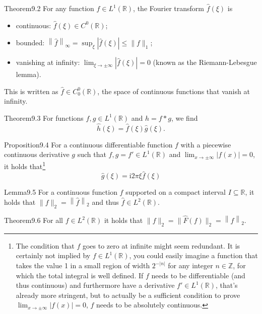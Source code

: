 \begin{res}{Theorem}{9.2}
For any function $f\in L^1(\mathbb R)$, the Fourier transform $\widehat f(\xi)$ is
\begin{itemize}
\item continuous: $\widehat f(\xi)\in C^0(\mathbb R)$;
\item bounded: $\left\|\widehat f\right\|_\infty=\sup_\xi\left|\widehat f(\xi)\right|\le\|f\|_1$;
\item vanishing at infinity: $\lim_{\xi\to\pm\infty}\left|\widehat f(\xi)\right|=0$ (known as the Riemann-Lebesgue lemma).
\end{itemize}
This is written as $\widehat f\in C^0_0(\mathbb R)$, the space of continuous functions that vanish at infinity.
\end{res}

\begin{res}[Convolution]{Theorem}{9.3}
For functions $f,g\in L^1(\mathbb R)$ and $h=f*g$, we find
\begin{equation}\widehat h(\xi)=\widehat f(\xi)\widehat g(\xi).\tag{9.16}\end{equation}
\end{res}

\begin{res}{Proposition}{9.4}
For a continuous differentiable function $f$ with a piecewise continuous derivative $g$ such that $f,g=f'\in L^1(\mathbb R)$ and $\lim_{x\to\pm\infty}|f(x)|=0$, it holds that\footnote{The condition that $f$ goes to zero at infinite might seem redundant. It is certainly not implied by $f\in L^1(\mathbb R)$, you could easily imagine a function that takes the value 1 in a small region of width $2^{-|n|}$ for any integer $n\in\mathbb Z$, for which the total integral is well defined. If $f$ needs to be differentiable (and thus continuous) and furthermore have a derivative $f'\in L^1(\mathbb R)$, that's already more stringent, but to actually be a sufficient condition to prove $\lim_{x\to\pm\infty}|f(x)|=0$, $f$ needs to be absolutely continuous.}
\[\widehat g(\xi)=\mathrm i2\pi\xi\widehat f(\xi)\]
\end{res}

\begin{res}{Lemma}{9.5}
For a continuous function $f$ supported on a compact interval $I\subseteq\mathbb R$, it holds that $\|f\|_2=\left\|\widehat f\right\|_2$ and thus $\widehat f\in L^2(\mathbb R)$.
\end{res}

\begin{res}[Plancherel]{Theorem}{9.6}
For all $f\in L^2(\mathbb R)$ it holds that $\|f\|_2=\|\hat F(f)\|_2=\left\|\widehat f\right\|_2$.
\end{res}

